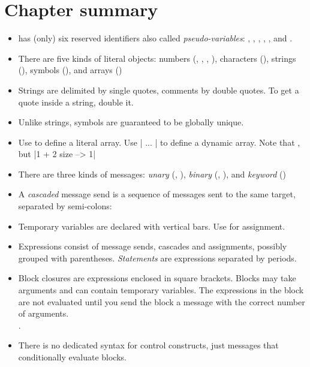 \documentclass[a4paper,10pt,twoside]{book}
\begin{document}
\section{Chapter summary}

\begin{itemize}

\item	\sq has (only) six reserved identifiers also called \textit{pseudo-variables}:
		, , , , , and .

\item	There are five kinds of literal objects:
		numbers (, , , ), characters (), strings (), symbols (), and arrays ()

\item	Strings are delimited by single quotes, comments by double quotes.
		To get a quote inside a string, double it.

\item	Unlike strings, symbols are guaranteed to be globally unique.

\item	Use  to define a literal array.
		Use \ct|{ ... }| to define a dynamic array.
		Note that
		, but
		\ct|{1 + 2} size --> 1|

\item	There are three kinds of messages:
		\emph{unary} (\eg {}, ),
		\emph{binary} (\eg {}, ), and
		\emph{keyword} (\eg {})

\item	A \emph{cascaded} message send is a sequence of messages sent to the same target, separated by semi-colons:

\item	Temporary variables are declared with vertical bars.
		Use \ct{:=} for assignment.

\item	Expressions consist of message sends, cascades and assignments, possibly grouped with parentheses.
		\emph{Statements} are expressions separated by periods.

\item	Block closures are expressions enclosed in square brackets.
		Blocks may take arguments and can contain temporary variables.
		The expressions in the block are not evaluated until you send the block a
		 message with the correct number of arguments.\\
		.

\item	There is no dedicated syntax for control constructs, just messages that conditionally evaluate blocks.\\

\end{itemize}

\ifx\wholebook\relax\else
\end{document}
